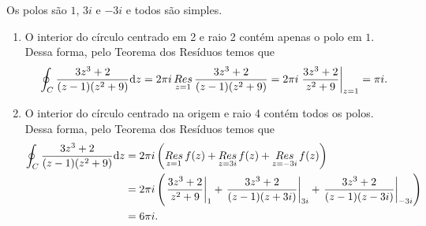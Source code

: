 \begin{questions}
%
\begin{solution}
    Os polos são $1$, $3i$ e $-3i$ e todos são simples.
    \begin{enumerate}[label=(\alph*)]
        \item O interior do círculo centrado em 2 e raio 2 contém apenas o polo em $1$. Dessa forma, pelo Teorema dos Resíduos temos que
        \begin{align*}
            \oint_C \frac{3z^3 + 2}{(z-1)(z^2 + 9)} \mathrm{d} z
                = 2\pi i\mathop{Res}\limits_{z=1} \frac{3z^3 + 2}{(z-1)(z^2 + 9)}
                = 2\pi i\left.\frac{3z^3 + 2}{z^2 + 9} \right|_{z=1}
                = \pi i.
        \end{align*}
        \item O interior do círculo centrado na origem e raio 4 contém todos os polos. Dessa forma, pelo Teorema dos Resíduos temos que
        \begin{align*}
            \oint_C \frac{3z^3 + 2}{(z-1)(z^2 + 9)} \mathrm{d} z
                &= 2\pi i \left(\mathop{Res}\limits_{z=1} f(z) + \mathop{Res}\limits_{z=3i} f(z) + \mathop{Res}\limits_{z=-3i} f(z) \right) \\
                &= 2\pi i \left(\left.\frac{3z^3 + 2}{z^2 + 9} \right|_{1} + \left.\frac{3z^3 + 2}{(z-1)(z+3i)} \right|_{3i} + \left.\frac{3z^3 + 2}{(z-1)(z-3i)} \right|_{-3i} \right)\\
                &= 6 \pi i.
        \end{align*}
    \end{enumerate}
\end{solution}


\end{questions}
